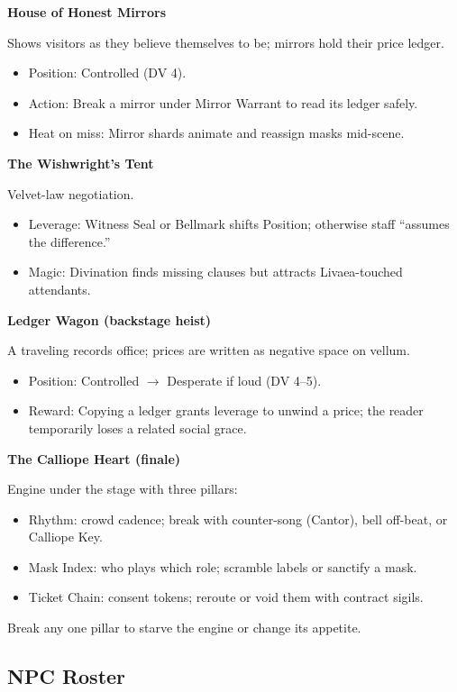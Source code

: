 \documentclass[11pt]{article}
\newcommand{\divider}{\vspace{12pt}\noindent\makebox[\linewidth]{\rule{\textwidth}{0.4pt}}\vspace{12pt}}
\begin{document}
\textbf{House of Honest Mirrors}

Shows visitors as they believe themselves to be; mirrors hold their price ledger.
\begin{itemize}
\item Position: Controlled (DV 4).
\item Action: Break a mirror under Mirror Warrant to read its ledger safely.
\item Heat on miss: Mirror shards animate and reassign masks mid-scene.
\end{itemize}

\textbf{The Wishwright's Tent}

Velvet-law negotiation.
\begin{itemize}
\item Leverage: Witness Seal or Bellmark shifts Position; otherwise staff ``assumes the difference.''
\item Magic: Divination finds missing clauses but attracts Livaea-touched attendants.
\end{itemize}

\textbf{Ledger Wagon (backstage heist)}

A traveling records office; prices are written as negative space on vellum.
\begin{itemize}
\item Position: Controlled $\rightarrow$ Desperate if loud (DV 4--5).
\item Reward: Copying a ledger grants leverage to unwind a price; the reader temporarily loses a related social grace.
\end{itemize}

\textbf{The Calliope Heart (finale)}

Engine under the stage with three pillars:
\begin{itemize}
\item Rhythm: crowd cadence; break with counter-song (Cantor), bell off-beat, or Calliope Key.
\item Mask Index: who plays which role; scramble labels or sanctify a mask.
\item Ticket Chain: consent tokens; reroute or void them with contract sigils.
\end{itemize}

Break any one pillar to starve the engine or change its appetite.

\divider

\subsection*{NPC Roster}
\end{document}
